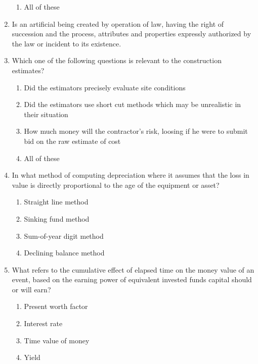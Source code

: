 \documentclass[11pt,a4paper]{article}
\begin{document}
\begin{enumerate}
\begin{enumerate}[label=\Alph*.]
\item{All of these}
\end{enumerate}
\item{Is an artificial being created by operation of law, having the right of succession and the process, attributes and properties expressly authorized by the law or incident to its existence.}
\\
\item{Which one of the following questions is relevant to the construction estimates?}
\begin{enumerate}[label=\Alph*.]
\item{Did the estimators precisely evaluate site conditions}
\item{Did the estimators use short cut methods which may be unrealistic in their situation}
\item{How much money will the contractor's risk, loosing if he were to submit bid on the raw estimate of cost}
\item{All of these}
\end{enumerate}
\item{In what method of computing depreciation where it assumes that the loss in value is directly proportional to the age of the equipment or asset?}
\begin{enumerate}[label=\Alph*.]
\item{Straight line method}
\item{Sinking fund method}
\item{Sum-of-year digit method}
\item{Declining balance method}
\end{enumerate}
\item{What refers to the cumulative effect of elapsed time on the money value of an event, based on the earning power of equivalent invested funds capital should or will earn?}
\begin{enumerate}[label=\Alph*.]
\item{Present worth factor}
\item{Interest rate}
\item{Time value of money}
\item{Yield}

\end{enumerate}
\end{enumerate}
\end{document}
